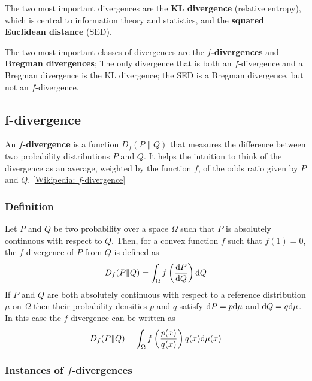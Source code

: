 The two most important divergences are the \textbf{KL divergence} (relative entropy), which is central to information theory
and statistics, and the \textbf{squared Euclidean distance} (SED).

The two most important classes of divergences are the \textbf{$f$-divergences} and \textbf{Bregman divergences};
The only divergence that is both an $f$-divergence and a Bregman divergence is the KL divergence;
the SED is a Bregman divergence, but not an $f$-divergence.

\subsection{f-divergence}
An \textbf{$f$-divergence} is a function $D_f(P\|Q)$ that measures the difference between two probability
distributions $P$ and $Q$. It helps the intuition to think of the divergence as an average, weighted by the
function $f$, of the odds ratio given by $P$ and $Q$. [\href{https://en.wikipedia.org/wiki/F-divergence}{Wikipedia: $f$-divergence}]

\subsubsection{Definition}
Let $P$ and $Q$ be two probability over a space $\Omega$ such that $P$ is absolutely continuous with respect to
$Q$. Then, for a convex function $f$ such that $f(1)=0$, the $f$-divergence of $P$ from $Q$ is defined as
\begin{equation}
    D_f(P\|Q) = \int_{\Omega}f\left(\frac{\mathrm{d} P}{\mathrm{d} Q}\right) \mathrm{d} Q
\end{equation}
If $P$ and $Q$ are both absolutely continuous with respect to a reference distribution $\mu$ on $\Omega$ then their
probability densities $p$ and $q$ satisfy $\mathrm{d} P = p \mathrm{d} \mu$ and $\mathrm{d} Q = q \mathrm{d} \mu$. In this case the $f$-divergence can
be written as
\begin{equation}
    D_f(P\|Q) = \int_{\Omega} f\left(\frac{p(x)}{q(x)}\right) q(x) \mathrm{d} \mu(x)
\end{equation}

\subsubsection{Instances of $f$-divergences}

